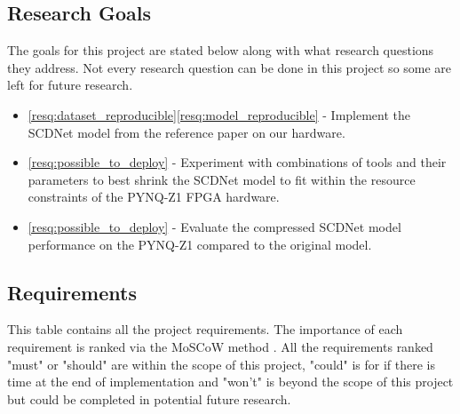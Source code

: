 \documentclass[12pt,nonacm,acmlarge,titlepage,screen]{acmart}
\begin{document}
	\subsection{Research Goals}
	The goals for this project are stated below along with what research questions they address. Not every research question can be done in this project so some are left for future research.
	\begin{itemize}
		\item \ref{resq:dataset_reproducible}\ref{resq:model_reproducible} - Implement the SCDNet model from the reference paper on our hardware.
		\item \ref{resq:possible_to_deploy} - Experiment with combinations of tools and their parameters to best shrink the SCDNet model to fit within the resource constraints of the PYNQ-Z1 FPGA hardware.
		\item \ref{resq:possible_to_deploy} - Evaluate the compressed SCDNet model performance on the PYNQ-Z1 compared to the original model.
	\end{itemize}

	\subsection{Requirements}
	This table contains all the project requirements. The importance of each requirement is ranked via the MoSCoW method \cite{moscow_paper}. All the requirements ranked "must" or "should" are within the scope of this project, "could" is for if there is time at the end of implementation and "won't" is beyond the scope of this project but could be completed in potential future research.
\end{document}
